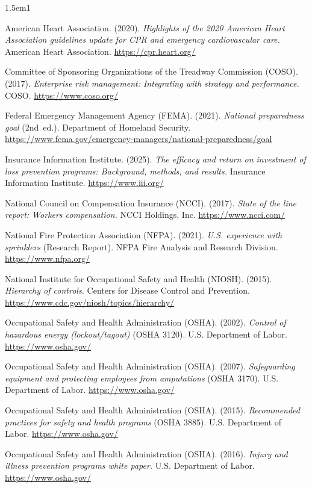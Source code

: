 \documentclass[11pt,openany]{book}
\begin{document}
\begin{hangparas}{1.5em}{1}

American Heart Association. (2020). \emph{Highlights of the 2020 American
Heart Association guidelines update for CPR and emergency cardiovascular
care.} American Heart Association. \url{https://cpr.heart.org/}

Committee of Sponsoring Organizations of the Treadway Commission (COSO).
(2017). \emph{Enterprise risk management: Integrating with strategy and
performance.} COSO. \url{https://www.coso.org/}

Federal Emergency Management Agency (FEMA). (2021). \emph{National
preparedness goal} (2nd~ed.). Department of Homeland Security.
\url{https://www.fema.gov/emergency-managers/national-preparedness/goal}

Insurance Information Institute. (2025). \emph{The efficacy and return on
investment of loss prevention programs: Background, methods, and results.}
Insurance Information Institute. \url{https://www.iii.org/}

National Council on Compensation Insurance (NCCI). (2017). \emph{State of the
line report: Workers compensation.} NCCI Holdings, Inc.
\url{https://www.ncci.com/}

National Fire Protection Association (NFPA). (2021). \emph{U.S. experience
with sprinklers} (Research Report). NFPA Fire Analysis and Research Division.
\url{https://www.nfpa.org/}

National Institute for Occupational Safety and Health (NIOSH). (2015).
\emph{Hierarchy of controls.} Centers for Disease Control and Prevention.
\url{https://www.cdc.gov/niosh/topics/hierarchy/}

Occupational Safety and Health Administration (OSHA). (2002). \emph{Control of
hazardous energy (lockout/tagout)} (OSHA 3120). U.S. Department of Labor.
\url{https://www.osha.gov/}

Occupational Safety and Health Administration (OSHA). (2007).
\emph{Safeguarding equipment and protecting employees from amputations} (OSHA
3170). U.S. Department of Labor. \url{https://www.osha.gov/}

Occupational Safety and Health Administration (OSHA). (2015).
\emph{Recommended practices for safety and health programs} (OSHA 3885).
U.S. Department of Labor. \url{https://www.osha.gov/}

Occupational Safety and Health Administration (OSHA). (2016). \emph{Injury and
illness prevention programs white paper.} U.S. Department of Labor.
\url{https://www.osha.gov/}


\end{hangparas}
\end{document}
